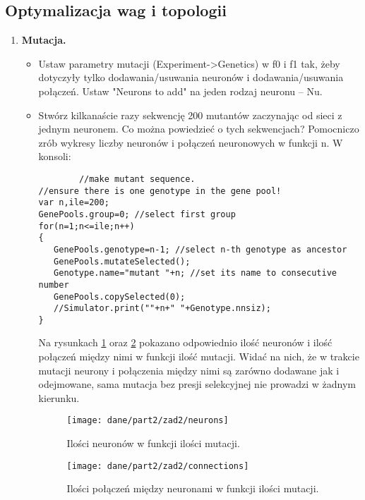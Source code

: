 \subsection{ Optymalizacja wag i topologii }

\begin{enumerate}
\item \textbf{Mutacja.}
	\begin{itemize}
		\item Ustaw parametry mutacji (Experiment->Genetics) w f0 i f1 tak, żeby dotyczyły tylko dodawania/usuwania neuronów i dodawania/usuwania połączeń. Ustaw "Neurons to add" na jeden rodzaj neuronu – Nu.
		\item Stwórz kilkanaście razy sekwencję 200 mutantów zaczynając od sieci z jednym neuronem. Co można powiedzieć o tych sekwencjach? Pomocniczo zrób wykresy liczby neuronów i połączeń neuronowych w funkcji n. 
W konsoli:
		\begin{verbatim}
		//make mutant sequence.
//ensure there is one genotype in the gene pool! 
var n,ile=200;
GenePools.group=0; //select first group
for(n=1;n<=ile;n++)
{
   GenePools.genotype=n-1; //select n-th genotype as ancestor
   GenePools.mutateSelected();
   Genotype.name="mutant "+n; //set its name to consecutive number
   GenePools.copySelected(0);
   //Simulator.print(""+n+" "+Genotype.nnsiz);
}
		\end{verbatim}

Na rysunkach \ref{fig:mutations-neurons} oraz \ref{fig:mutations-connections} pokazano odpowiednio ilość neuronów i ilość połączeń między nimi w funkcji ilość mutacji. Widać na nich, że w trakcie mutacji neurony i połączenia między nimi są zarówno dodawane jak i odejmowane, sama mutacja bez presji selekcyjnej nie prowadzi w żadnym kierunku.
		
	\begin{figure}[h]
	\centering
	\texttt{[image: dane/part2/zad2/neurons]}
	\caption{Ilości neuronów w funkcji ilości mutacji.\label{fig:mutations-neurons}}
	\end{figure}
	
		\begin{figure}[h]
	\centering
	\texttt{[image: dane/part2/zad2/connections]}
	\caption{Ilości połączeń między neuronami w funkcji ilości mutacji.\label{fig:mutations-connections}}
	\end{figure}
		

\end{itemize}
\end{enumerate}
